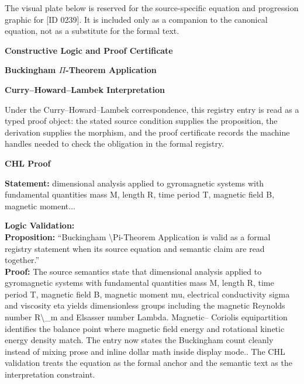 \begingroup\footnotesize\sloppy
The visual plate below is reserved for the source-specific equation and progression graphic for [ID 0239]. It is included only as a companion to the canonical equation, not as a substitute for the formal text.
\par\endgroup
\ifTZPDarkEdition
{}
\fi

\clearpage
\begingroup\tzpsupportsetup
\noindent\textbf{\fontsize{10.8pt}{12.8pt}\selectfont [ID 0239] Constructive Logic and Proof Certificate}\par
\noindent\textbf{\fontsize{10pt}{12pt}\selectfont Buckingham $\Pi$-Theorem Application}\par
\vspace{0.45em}
\begingroup
\footnotesize
\setlength{\parskip}{0.22em}
\setlength{\parindent}{0pt}
\noindent\textbf{Curry--Howard--Lambek Interpretation}\par
Under the Curry--Howard--Lambek correspondence, this registry entry is read as a typed proof
object: the stated source condition supplies the proposition, the derivation supplies the
morphism, and the proof certificate records the machine handles needed to check the obligation
in the formal registry.

\vspace{0.45em}
\noindent\textbf{CHL Proof}\par
\textbf{Statement:} dimensional analysis applied to gyromagnetic systems with fundamental quantities mass M,
length R, time period T, magnetic field B, magnetic moment...

\textbf{Logic Validation:}\\
\textbf{Proposition:} ``Buckingham \textbackslash{}Pi-Theorem Application is valid as a formal registry statement when its
source equation and semantic claim are read together.''\\
\textbf{Proof:} The source semantics state that dimensional analysis applied to gyromagnetic systems
with fundamental quantities mass M, length R, time period T, magnetic field B, magnetic
moment mu, electrical conductivity sigma and viscosity eta yields dimensionless groups
including the magnetic Reynolds number R\textbackslash{}\_m and Elsasser number Lambda. Magnetic--
Coriolis equipartition identifies the balance point where magnetic field energy and
rotational kinetic energy density match. The entry now states the Buckingham count
cleanly instead of mixing prose and inline dollar math inside display mode.. The CHL
validation treats the equation as the formal anchor and the semantic text as the
interpretation constraint.

